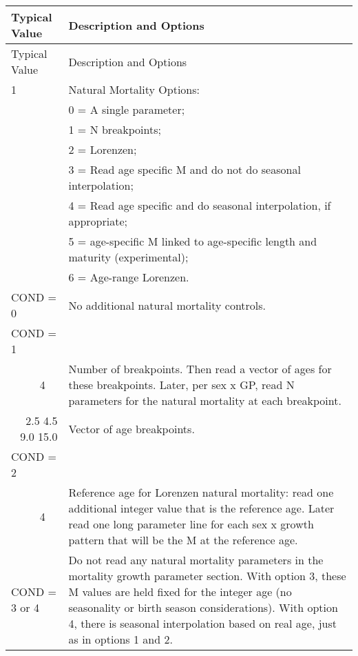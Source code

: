 \begin{longtable}{p{0.5cm} p{2cm} p{12.75cm}}
	\hline	
	\multicolumn{2}{l}{Typical Value} & Description and Options \Tstrut\Bstrut\\
	\hline
	\endfirsthead

	\hline
	\multicolumn{2}{l}{Typical Value} & Description and Options \Tstrut\Bstrut\\
	\hline
	\endhead
	\hline

	\endfoot
	
	\endlastfoot

	1 & & Natural Mortality Options: \Tstrut\\
	  & & 0 = A single parameter; \\
	  & & 1 = N breakpoints; \\
	  & & 2 = Lorenzen; \\
	  & & 3 = Read age specific M and do not do seasonal interpolation; \\
	  & & 4 = Read age specific and do seasonal interpolation, if appropriate; \\
	  & & 5 = age-specific M linked to age-specific length and maturity (experimental); \\
	  & & 6 = Age-range Lorenzen. \Bstrut\\
	\hline

	\multicolumn{2}{l}{COND = 0} & No additional natural mortality controls. \Tstrut\Bstrut\\
	\hline

	\multicolumn{2}{l}{COND = 1} & \Tstrut\Bstrut\\
	& 4 & Number of breakpoints. Then read a vector of ages for these breakpoints. Later, per sex x GP, read N parameters for the natural mortality at each breakpoint. \\

	\multicolumn{2}{r}{2.5 4.5 9.0 15.0} & Vector of age breakpoints. \Bstrut\\
	\hline
	
	\multicolumn{2}{l}{COND = 2} & \Tstrut\\
	& 4 \Tstrut & Reference age for Lorenzen natural mortality: read one additional integer value that is the reference age. Later read one long parameter line for each sex x growth pattern that will be the M at the reference age. \\
	\hline
	
	\multicolumn{2}{l}{COND = 3 or 4} \Tstrut & Do not read any natural mortality parameters in the mortality growth parameter section. With option 3, these M values are held fixed for the integer age (no seasonality or birth season considerations). With option 4, there is seasonal interpolation based on real age, just as in options 1 and 2.\\


\end{longtable}
